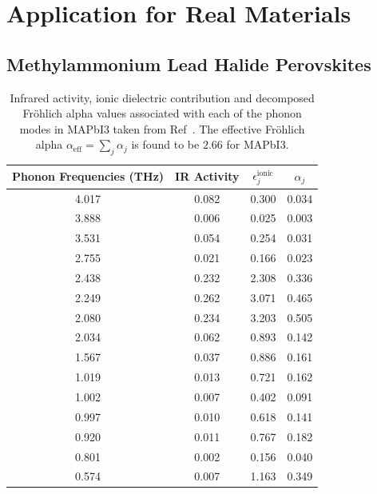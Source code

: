 \chapter{Application for Real Materials}
\label{chap:sixth}



\section{Methylammonium Lead Halide Perovskites}
\label{sec:chap-sixth-first}

\begin{table}
\begin{center}
\begin{tabular}{||c|c|c|c||} 
\hline\hline
Phonon Frequencies (THz) & IR Activity & $\epsilon^{\text{ionic}}_j$ & $\alpha_j$ \\
\hline\hline
4.017 & 0.082 & 0.300 & 0.034 \\
\hline
3.888 & 0.006 & 0.025 & 0.003 \\
\hline
3.531 & 0.054 & 0.254 & 0.031 \\ 
\hline
2.755 & 0.021 & 0.166 & 0.023 \\
\hline
2.438 & 0.232 & 2.308 & 0.336 \\
\hline
2.249 & 0.262 & 3.071 & 0.465 \\
\hline
2.080 & 0.234 & 3.203 & 0.505 \\
\hline
2.034 & 0.062 & 0.893 & 0.142 \\
\hline
1.567 & 0.037 & 0.886 & 0.161 \\
\hline
1.019 & 0.013 & 0.721 & 0.162 \\
\hline
1.002 & 0.007 & 0.402 & 0.091 \\
\hline
0.997 & 0.010 & 0.618 & 0.141 \\
\hline
0.920 & 0.011 & 0.767 & 0.182 \\
\hline
0.801 & 0.002 & 0.156 & 0.040 \\
\hline
0.574 & 0.007 & 1.163 & 0.349 \\
\hline\hline
\end{tabular} \label{table:mapidata}
\caption{Infrared activity, ionic dielectric contribution and decomposed Fr\"ohlich alpha values associated with each of the phonon modes in MAPbI3 taken from Ref~\cite{brivio_lattice_2015}. The effective Fr\"ohlich alpha $\alpha_{\text{eff}} = \sum_j \alpha_j$ is found to be $2.66$ for MAPbI3.}
\end{center}
\end{table}

